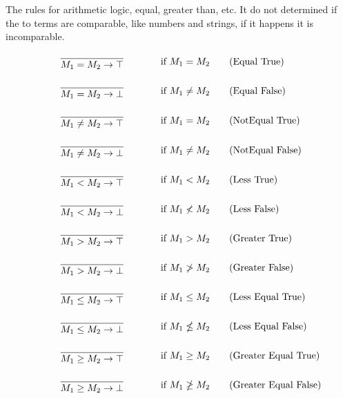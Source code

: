 The rules for arithmetic logic, equal, greater than, etc. It do not determined if the to terms are comparable, like numbers and strings, if it happens it is incomparable.
\begin{align*}
\infrule{}{M_1 = M_2 \ra \top}& \text{if }M_1=M_2 \tag{Equal True}\\
\infrule{}{M_1 = M_2 \ra \bot}& \text{if }M_1\neq M_2 \tag{Equal False}\\
\infrule{}{M_1 \neq M_2 \ra \top}& \text{if }M_1=M_2 \tag{NotEqual True}\\
\infrule{}{M_1 \neq M_2 \ra \bot}& \text{if }M_1\neq M_2 \tag{NotEqual False}\\
\infrule{}{M_1 < M_2 \ra \top}& \text{if }M_1<M_2 \tag{Less True}\\
\infrule{}{M_1 < M_2 \ra \bot}& \text{if }M_1\nless M_2 \tag{Less False}\\
\infrule{}{M_1 > M_2 \ra \top}& \text{if }M_1>M_2 \tag{Greater True}\\
\infrule{}{M_1 > M_2 \ra \bot}& \text{if }M_1\ngtr M_2 \tag{Greater False}\\
\infrule{}{M_1 \leq M_2 \ra \top}& \text{if }M_1\leq M_2 \tag{Less Equal True}\\
\infrule{}{M_1 \leq M_2 \ra \bot}& \text{if }M_1\nleq M_2 \tag{Less Equal False}\\
\infrule{}{M_1 \geq M_2 \ra \top}& \text{if }M_1\geq M_2 \tag{Greater Equal True}\\
\infrule{}{M_1 \geq M_2 \ra \bot}& \text{if }M_1\ngeq M_2 \tag{Greater Equal False}
\end{align*}
	

\FloatBarrier



